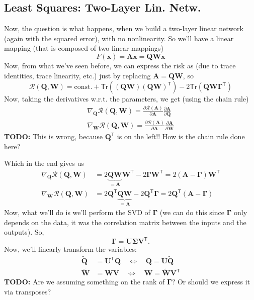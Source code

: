 \documentclass[a2paper,8pt]{extarticle}
\newcommand{\cR}{\mathcal{R}}
\newcommand{\Tr}[1]{\mathsf{Tr}\left( #1 \right)}
\newcommand*{\T}{\mathsf{T}}
\newcommand{\mat}[1]{\mathbf{#1}}
\renewcommand{\vec}[1]{\mathbf{#1}}
\newcommand{\vx}{\vec{x}}
\newcommand{\MA}{\mat{A}}
\newcommand{\MQ}{\mat{Q}}
\newcommand{\MU}{\mat{U}}
\newcommand{\MV}{\mat{V}}
\newcommand{\MW}{\mat{W}}
\newcommand{\MGamma}{\mat{\Gamma}}
\newcommand{\MSigma}{\mat{\Sigma}}
\newcommand{\todo}[1]{\textbf{TODO:} #1}
\newcommand{\todo}[1]{%
}
\begin{document}
\begin{landscape}
\begin{multicols*}{7}
\subsection{Least Squares: Two-Layer Lin. Netw.}

Now, the question is what happens, when we build a two-layer linear network
(again with the squared error), with no nonlinearity. So we'll have a linear
mapping (that is composed of two linear mappings)
\[
F(\vx)=\MA\vx=\MQ\MW\vx
\]
Now, from what we've seen before, we can express the risk as (due to trace
identities, trace linearity, etc.) just by replacing $\MA=\MQ\MW$, so
\[
\cR(\MQ,\MW) = \text{const.}+\Tr{(\MQ\MW)(\MQ\MW)^\T}
-2\Tr{\MQ\MW\MGamma^\T}
\]
Now, taking the derivatives w.r.t. the parameters, we get (using the chain rule)
\begin{align*}
\nabla_{\MQ}\cR(\MQ,\MW)
=
\frac{\partial \cR(\MA)}{\partial \MA}
\frac{\partial \MA}{\partial\MQ}
\\
\nabla_{\MW}\cR(\MQ,\MW)
=
\frac{\partial \cR(\MA)}{\partial \MA}
\frac{\partial \MA}{\partial\MW}
\end{align*}
\todo{This is wrong, because $\MQ^\T$ is on the left!! How is the chain rule
done here?}

Which in the end gives us
\begin{align*}
\nabla_{\MQ}\cR(\MQ,\MW)
&=
2\underbrace{\MQ\MW}_{=\MA}\MW^\T-2\MGamma\MW^\T
=2(\MA-\MGamma)\MW^\T
\\
\nabla_{\MW}\cR(\MQ,\MW)
&=2\MQ^\T\underbrace{\MQ\MW}_{=\MA}-2\MQ^\T\MGamma
=2\MQ^\T(\MA-\MGamma)
\end{align*}
Now, what we'll do is we'll perform the SVD of $\MGamma$ (we can do this since
$\MGamma$ only depends on the data, it was the correlation matrix between the
inputs and the outputs).
So,
\[
\MGamma=\MU\MSigma\MV^\T.
\]
Now, we'll linearly transform the variables:
\begin{align*}
\widetilde{\MQ}&=\MU^\T\MQ
\quad\Longleftrightarrow\quad
\MQ=\MU\widetilde{\MQ}
\\
\widetilde{\MW}&=\MW\MV
\quad\Longleftrightarrow\quad
\MW=\widetilde{\MW}\MV^\T
\end{align*}
\todo{Are we assuming something on the rank of $\MGamma$? Or should we express
it via transposes?}


\end{multicols*}
\end{landscape}
\end{document}
